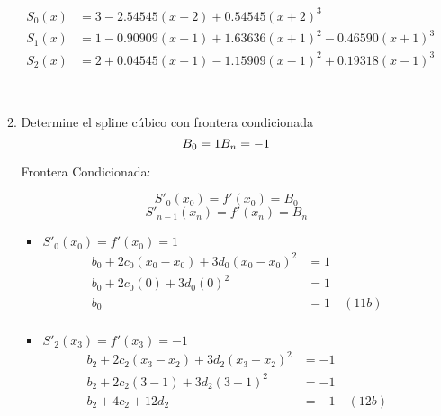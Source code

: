 \documentclass[12pt]{article}
\begin{document}
\begin{enumerate}
\begin{enumerate}
        
        
        \[
        \begin{aligned}
        S_0(x) &= 3 - 2.54545(x + 2) + 0.54545(x + 2)^3 \\
        S_1(x) &= 1 - 0.90909(x + 1) + 1.63636(x + 1)^2 - 0.46590(x + 1)^3 \\
        S_2(x) &= 2 + 0.04545(x - 1) - 1.15909(x - 1)^2 + 0.19318(x - 1)^3
        \end{aligned}
        \]

        
        
        
        
        
        
        
        
        
        
        
        
        
        
        
        \
        
        \item Determine el spline cúbico con frontera condicionada
        \[
        B_0 = 1 \\
        B_n = -1
        \]

        Frontera Condicionada:

        \[S'_0(x_0) = f'(x_0) = B_0\]
        \[S'_{n-1}(x_n) = f'(x_n) = B_n\]
        \begin{itemize}
            \item $S'_0(x_0) = f'(x_0) = 1$
            \[
            \begin{aligned}
            b_0 + 2c_0(x_0 - x_0) + 3d_0(x_0 - x_0)^2 &= 1\\  
            b_0 + 2c_0(0) + 3d_0(0)^2 &= 1\\  
            b_0  &= 1 \quad (11b)\\  
            \end{aligned}
            \]            
            \item $S'_2(x_3) = f'(x_3) = -1$
            \[
            \begin{aligned}
            b_2 + 2c_2(x_3 - x_2) + 3d_2(x_3 - x_2)^2 &= -1\\  
            b_2 + 2c_2(3-1) + 3d_2(3-1)^2 &= -1\\  
            b_2 + 4c_2 + 12d_2 &= -1 \quad (12b)\\  
            \end{aligned}
            \]  
        \end{itemize}
    \end{enumerate}


\end{enumerate}
\end{document}
